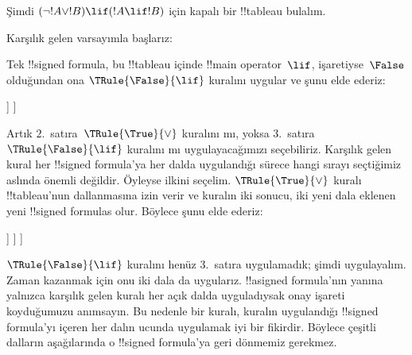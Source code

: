 \documentclass[../../../include/open-logic-section]{subfiles}
\begin{document}
\begin{ex}
Şimdi $(\lnot !A \lor !B) \lif (!A \lif !B)$ için kapalı bir !!{tableau}
bulalım.

Karşılık gelen varsayımla başlarız:
\begin{oltableau}
  [\sFmla{\False}{(\lnot \formula{A} \lor \formula{B}) \lif
      (\formula{A} \lif \formula{B})}, just=\TAss]
\end{oltableau}
Tek !!{signed formula}, bu !!{tableau} içinde !!{main operator}~$\lif$,
işaretiyse~$\False$ olduğundan ona $\TRule{\False}{\lif}$ kuralını
uygular ve şunu elde ederiz:
\begin{oltableau}
  [\sFmla{\False}{(\lnot \formula{A} \lor \formula{B})
      \lif (\formula{A} \lif \formula{B})}, just=\TAss, checked
    [\sFmla{\True}{\lnot \formula{A} \lor \formula{B}},
      just={\TRule{\False}{\lif}[1]}
      [\sFmla{\False}{(\formula{A} \lif \formula{B})},
        just={\TRule{\False}{\lif}[1]}
      ]
    ]
  ]
\end{oltableau}
Artık $2$.~satıra~$\TRule{\True}{\lor}$ kuralını mı, yoksa
$3$.~satıra $\TRule{\False}{\lif}$ kuralını mı uygulayacağımızı
seçebiliriz. Karşılık gelen kural her !!{signed formula}'ya her dalda
uygulandığı sürece hangi sırayı seçtiğimiz aslında önemli değildir.
Öyleyse ilkini seçelim. $\TRule{\True}{\lor}$ kuralı !!{tableau}'nun
dallanmasına izin verir ve kuralın iki sonucu, iki yeni dala eklenen yeni
!!{signed formula}s olur. Böylece şunu elde ederiz:
\begin{oltableau}
  [\sFmla{\False}{(\lnot \formula{A} \lor \formula{B}) \lif
      (\formula{A} \lif \formula{B})}, just=\TAss, checked
    [\sFmla{\True}{\lnot \formula{A} \lor \formula{B}},
      just={\TRule{\False}{\lif}[1]}, checked
      [\sFmla{\False}{(\formula{A} \lif \formula{B})},
        just={\TRule{\False}{\lif}[1]}
        [\sFmla{\True}{\lnot \formula{A}}, just={\TRule{\True}{\lor}[2]}]
        [\sFmla{\True}{\formula{B}}, just={\TRule{\True}{\lor}[2]}]
      ]
    ]
  ]
\end{oltableau}
$\TRule{\False}{\lif}$ kuralını henüz $3$.~satıra uygulamadık; şimdi
uygulayalım. Zaman kazanmak için onu iki dala da uygularız.
!!a{signed formula}'nın yanına yalnızca karşılık gelen kuralı her açık dalda
uyguladıysak onay işareti koyduğumuzu anımsayın. Bu nedenle bir kuralı,
kuralın uygulandığı !!{signed formula}'yı içeren her dalın ucunda uygulamak
iyi bir fikirdir. Böylece çeşitli dalların aşağılarında o !!{signed
formula}'ya geri dönmemiz gerekmez.
\begin{oltableau}

\end{oltableau}
\end{ex}
\end{document}
